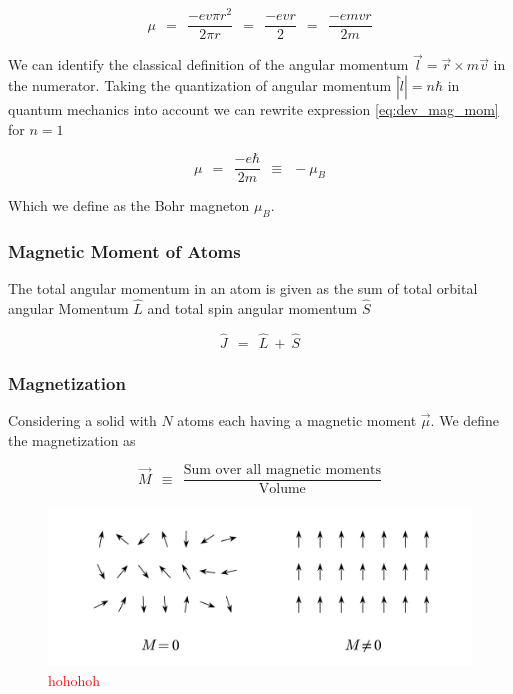 \documentclass[10pt]{report}
\numberwithin{equation}{chapter}
\begin{document}
\begin{equation} \label{eq:dev_mag_mom}
  \mu ~~=~~ \frac{-e v \pi r^2}{2 \pi r} ~~=~~ \frac{-evr}{2} ~~=~~ \frac{-e m v r}{2m}
\end{equation}

We can identify the classical definition of the angular momentum  $\vec{l} = \vec{r} \times m \vec{v}$ in the numerator. Taking the quantization of angular momentum $|\hat{l}| = n \hbar$ in quantum mechanics into account we can rewrite expression \ref{eq:dev_mag_mom} for $n=1$

\begin{equation} \label{eq:bohr_mag}
  \mu ~~=~~ \frac{-e \hbar}{2m} ~~ \equiv ~~ -\mu_B
\end{equation}

Which we define as the Bohr magneton $\mu_B$.


\subsubsection{Magnetic Moment of Atoms}

The total angular momentum in an atom is given as the sum of total orbital angular Momentum $\hat{L}$  and total spin angular momentum $\hat{S}$

\begin{equation}
  \hat{J} ~~=~~ \hat{L} ~+~ \hat{S}
\end{equation}

\subsubsection{Magnetization}

Considering a solid with $N$ atoms each having a magnetic moment $\vec{\mu}$. We define the magnetization as 

\begin{equation}
  \vec{M} ~~\equiv~~ \frac{\text{Sum over all magnetic moments}}{\text{Volume}}
\end{equation}

\begin{figure}
  \centering
  \includegraphics[width=0.8\linewidth]{../img/mag_in_solid.pdf}
  \caption{\textcolor{red}{hohohoh}}
\end{figure}
\end{document}
